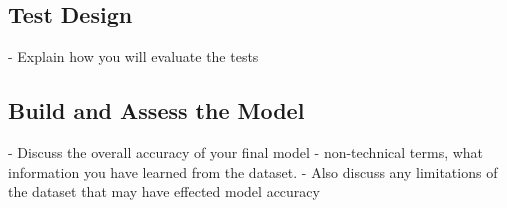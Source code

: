 \subsection*{Test Design}
- Explain how you will evaluate the tests
\subsection*{Build and Assess the Model}

- Discuss the overall accuracy of your final model
- non-technical terms, what information you have learned from the dataset.
- Also discuss any limitations of the dataset that may have effected
model accuracy

